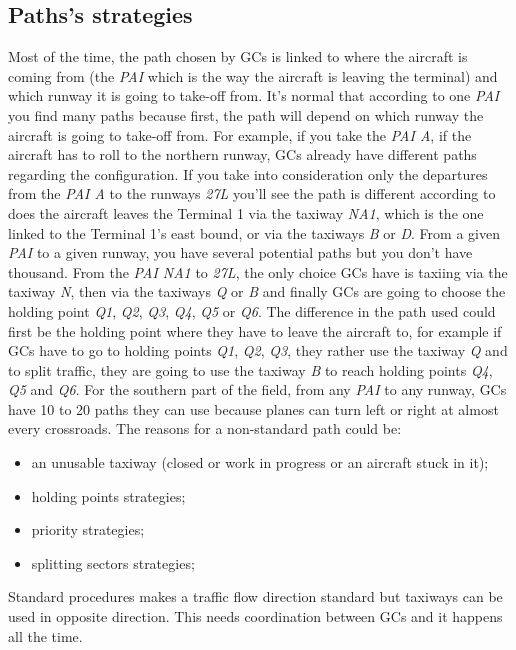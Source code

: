 \documentclass{article}
\begin{document}
\subsection{Paths's strategies}
Most of the time, the path chosen by GCs is linked to where the aircraft is coming from (the \textit{PAI} which is the way the aircraft is leaving the terminal) and which runway it is going to take-off from. It's normal that according to one \textit{PAI} you find many paths because first, the path will depend on which runway the aircraft is going to take-off from. For example, if you take the \textit{PAI A}, if the aircraft has to roll to the northern runway, GCs already have different paths regarding the configuration. If you take into consideration only the departures from the \textit{PAI A} to the runways \textit{27L} you'll see the path is different according to does the aircraft leaves the Terminal 1 via the taxiway \textit{NA1}, which is the one linked to the Terminal 1's east bound, or via the taxiways \textit{B} or \textit{D}.
From a given \textit{PAI} to a given runway, you have several potential paths but you don't have thousand. From the \textit{PAI NA1} to \textit{27L}, the only choice GCs have is taxiing via the taxiway \textit{N}, then via the taxiways \textit{Q} or \textit{B} and finally GCs are going to choose the holding point \textit{Q1}, \textit{Q2}, \textit{Q3}, \textit{Q4}, \textit{Q5} or \textit{Q6}. The difference in the path used could first be the holding point where they have to leave the aircraft to, for example if GCs have to go to holding points \textit{Q1}, \textit{Q2}, \textit{Q3}, they rather use the taxiway \textit{Q} and to split traffic, they are going to use the taxiway \textit{B} to reach holding points \textit{Q4}, \textit{Q5} and \textit{Q6}. For the southern part of the field, from any \textit{PAI} to any runway, GCs have 10 to 20 paths they can use because planes can turn left or right at almost every crossroads. The reasons for a non-standard path could be:
\begin{itemize}
    \item an unusable taxiway (closed or work in progress or an aircraft stuck in it);
    \item holding points strategies;
    \item priority strategies;
    \item splitting sectors strategies;
\end{itemize}
Standard procedures makes a traffic flow direction standard but taxiways can be used in opposite direction. This needs coordination between GCs and it happens all the time.
\end{document}
